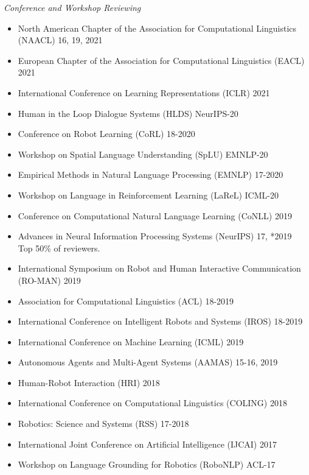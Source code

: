 \documentclass{res}
\begin{document}
\begin{resume}
{\sl Conference and Workshop Reviewing}
  \begin{itemize}
    \item North American Chapter of the Association for Computational Linguistics (NAACL) \hfill 16, 19, 2021
    \item European Chapter of the Association for Computational Linguistics (EACL) \hfill 2021
    \item International Conference on Learning Representations (ICLR) \hfill 2021
    \item Human in the Loop Dialogue Systems (HLDS) \hfill NeurIPS-20
    \item Conference on Robot Learning (CoRL) \hfill 18-2020
    \item Workshop on Spatial Language Understanding (SpLU) \hfill EMNLP-20
    \item Empirical Methods in Natural Language Processing (EMNLP) \hfill 17-2020
    \item Workshop on Language in Reinforcement Learning (LaReL) \hfill ICML-20
    \item Conference on Computational Natural Language Learning (CoNLL) \hfill 2019
    \item Advances in Neural Information Processing Systems (NeurIPS) \hfill 17, *2019
    \\ {\footnotesize *Top 50\% of reviewers.}
    \item International Symposium on Robot and Human Interactive Communication (RO-MAN) \hfill 2019
    \item Association for Computational Linguistics (ACL) \hfill 18-2019
    \item International Conference on Intelligent Robots and Systems (IROS) \hfill 18-2019
    \item International Conference on Machine Learning (ICML) \hfill 2019
    \item Autonomous Agents and Multi-Agent Systems (AAMAS) \hfill 15-16, 2019
    \item Human-Robot Interaction (HRI) \hfill 2018
    \item International Conference on Computational Linguistics (COLING) \hfill 2018
    \item Robotics: Science and Systems (RSS) \hfill 17-2018
    \item International Joint Conference on Artificial Intelligence (IJCAI) \hfill 2017
    \item Workshop on Language Grounding for Robotics (RoboNLP) \hfill ACL-17
  \end{itemize}


\end{resume}
\end{document}
